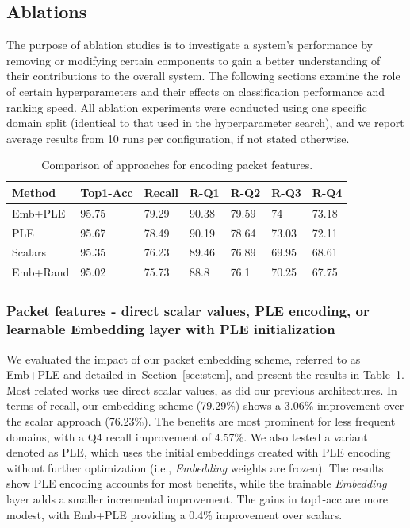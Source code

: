 \documentclass[lettersize,journal,twoside,article]{IEEEtran}
\newcommand{\secref}[1]{Section~\ref{#1}}
\newcommand{\tabref}[1]{Table~\ref{#1}}
\begin{document}
\subsection{Ablations}
The purpose of ablation studies is to investigate a system's performance by removing or modifying certain components to gain a better understanding of their contributions to the overall system.
The following sections examine the role of certain hyperparameters and their effects on classification performance and ranking speed. All ablation experiments were conducted using one specific domain split (identical to that used in the hyperparameter search), and we report average results from 10 runs per configuration, if not stated otherwise.

\begin{table}[b]
    \centering
    \footnotesize
    \setlength\extrarowheight{1pt}
    \caption{Comparison of approaches for encoding packet features.}
    \label{tab:packet-embedding}
    \begin{tabular}{|l|l|l|l|l|l|l|}
    \hline
        \textbf{Method} & \textbf{Top1-Acc} & \textbf{Recall} & \textbf{R-Q1} & \textbf{R-Q2} & \textbf{R-Q3} & \textbf{R-Q4} \\ \hline
        Emb+PLE & 95.75 & 79.29 & 90.38 & 79.59 & 74 & 73.18 \\ \hline
        PLE  & 95.67 & 78.49 & 90.19 & 78.64 & 73.03 & 72.11 \\ \hline
        Scalars & 95.35 & 76.23 & 89.46 & 76.89 & 69.95 & 68.61 \\ \hline
        Emb+Rand & 95.02 & 75.73 & 88.8 & 76.1 & 70.25 & 67.75 \\ \hline
    \end{tabular}
\end{table}

\subsubsection{Packet features - direct scalar values, PLE encoding, or learnable Embedding layer with PLE initialization}
\label{sec:ple}
We evaluated the impact of our packet embedding scheme, referred to as Emb+PLE and detailed in~\secref{sec:stem}, and present the results in \tabref{tab:packet-embedding}. Most related works use direct scalar values, as did our previous architectures. In terms of recall, our embedding scheme (79.29\%) shows a 3.06\% improvement over the scalar approach (76.23\%). The benefits are most prominent for less frequent domains, with a Q4 recall improvement of 4.57\%. We also tested a variant denoted as PLE, which uses the initial embeddings created with PLE encoding without further optimization (i.e., \textit{Embedding} weights are frozen). The results show PLE encoding accounts for most benefits, while the trainable \textit{Embedding} layer adds a smaller incremental improvement. The gains in top1-acc are more modest, with Emb+PLE providing a 0.4\% improvement over scalars.
\end{document}
